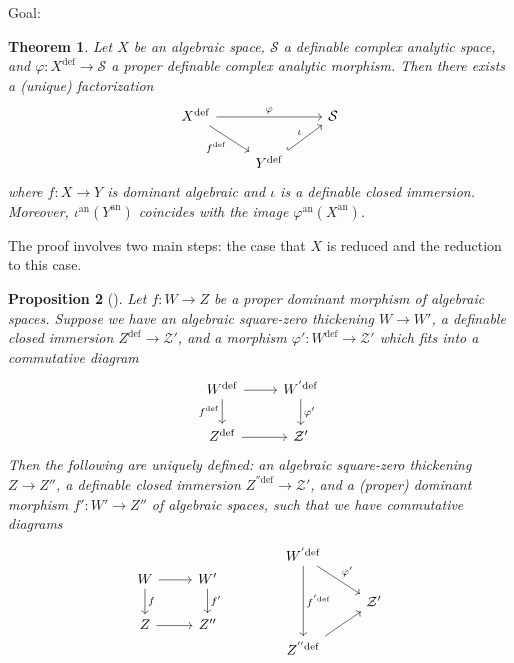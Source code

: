 \documentclass{amsart}
\newtheorem{theorem}{Theorem}[section]
\newtheorem{proposition}[theorem]{Proposition}
\theoremstyle{definition}
\numberwithin{equation}{section}
\newcommand{\definable}{\mathrm{def}}
\newcommand{\analytic}{\mathrm{an}}
\begin{document}
Goal:
\begin{theorem}
    Let $X$ be an algebraic space,
    $\mathcal{S}$ a definable complex analytic space,
    and $\varphi: X^{\definable} \to \mathcal{S}$ a proper definable complex analytic morphism.
    Then there exists a (unique) factorization
    \[\begin{tikzcd}
        X^{\definable}\ar[dr,"f^{\definable}"']\ar[rr,"\varphi"] & & \mathcal{S} \\
        & Y^{\definable} \ar[ur,"\iota",hook] & 
    \end{tikzcd}\]
    where $f: X \to Y$ is dominant algebraic and $\iota$ is a definable closed immersion.
    Moreover, $\iota^{\analytic}(Y^{\analytic})$ coincides with the image $\varphi^{\analytic}(X^{\analytic})$.
\end{theorem}

The proof involves two main steps:
the case that $X$ is reduced and the reduction to this case.

\begin{proposition}[{\cite[Proposition 4.5]{zbMATH07662555}}]
    Let $f: W \to Z$ be a proper dominant morphism of algebraic spaces.
    Suppose we have an algebraic square-zero thickening
    $W \to W'$, a definable closed immersion $Z^{\definable} \to \mathcal{Z}'$,
    and a morphism $\varphi': W^{\definable}\to \mathcal{Z}'$ which fits into a commutative diagram
    \[\begin{tikzcd}
        W^{\definable} \ar[r]\ar[d,"f^{\definable}"'] & W^{'\definable}\ar[d,"\varphi'"] \\
        Z^{\definable} \ar[r] & \mathcal{Z}'
    \end{tikzcd}\]
    Then the following are uniquely defined:
    an algebraic square-zero thickening
    $Z \to Z''$,
    a definable closed immersion $Z^{''\definable} \to \mathcal{Z}'$,
    and a (proper) dominant morphism $f': W' \to Z''$ of algebraic spaces,
    such that we have commutative diagrams
    \[
    \begin{tikzcd}
        W\ar[r]\ar[d,"f"] & W'\ar[d,"f'"] \\
        Z \ar[r] & Z''
    \end{tikzcd}
    \hspace{40pt}
    \begin{tikzcd}
        W^{'\definable}\ar[dd,"f^{'\definable}"]\ar[rd,"\varphi'"] & \\
        & \mathcal{Z}' \\
        Z^{''\definable}\ar[ur] &
    \end{tikzcd}
    \]
\end{proposition}
\end{document}

